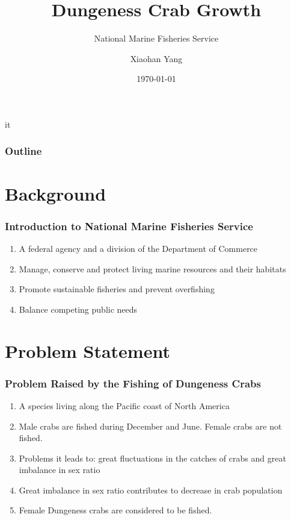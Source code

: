 it\documentclass[compress,handout,10pt]{beamer}
\title{{\color{blue} \LARGE Dungeness Crab Growth\newline} }
\subtitle{{\color{red} \large National Marine Fisheries Service} }
\author{ 
    {Xiaohan Yang} \\ 
    \vspace{5pt}
}
\institute{Johns Hopkins University}
\date{\mygreen \today}
\let\olditem\item
\renewcommand{\item}{\setlength{\itemsep}{0.5\baselineskip}\olditem}
\begin{document}
\begin{frame}[plain]
    \titlepage
\end{frame}

\begin{frame}
    \frametitle{Outline}
    \tableofcontents
\end{frame}

\section{Background}

\begin{frame}
    \frametitle{Introduction to National Marine Fisheries Service}
    \vspace{7pt}
             \begin{enumerate}
                 \item A federal agency and a division of the Department of Commerce
                 \item Manage, conserve and protect living marine resources and their habitats
                 \item Promote sustainable fisheries and prevent overfishing
                 \item Balance competing public needs
             \end{enumerate}
\end{frame}

\section{Problem Statement}
\begin{frame}
    \frametitle{Problem Raised by the Fishing of Dungeness Crabs}
     \begin{enumerate}
         \item A species living along the Pacific coast of North America
         \item Male crabs are fished during December and June. Female crabs are not fished.
         \item Problems it leads to: great fluctuations in the catches of crabs and great imbalance in sex ratio
         \item Great imbalance in sex ratio contributes to decrease in crab population
         \item Female Dungeness crabs are considered to be fished.
     \end{enumerate}
\end{frame}
\end{document}

